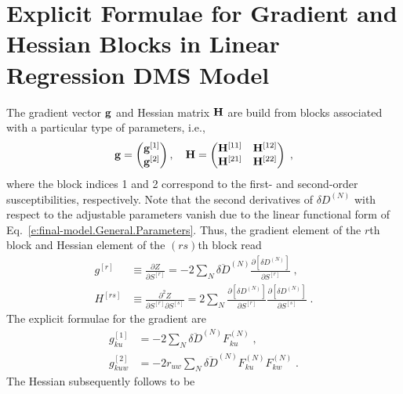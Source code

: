 \documentclass[aip,amsmath,amssymb,reprint,floatfix]{revtex4-1}
\begin{document}
\section{\label{a:blocks} Explicit Formulae for Gradient and Hessian Blocks in Linear Regression DMS Model}

The gradient vector ${\bf g}$ and Hessian matrix ${\bf H}$ 
are build from blocks associated with a particular type of parameters, i.e.,
%
\begin{equation}\label{e:Newton.gH}
 {\bf g} = 
\begin{pmatrix}
{\bf g}^{[1]} \\ 
{\bf g}^{[2]} 
\end{pmatrix} ,\quad
 {\bf H} = 
\begin{pmatrix}
{\bf H}^{[11]} & {\bf H}^{[12]}  \\ 
{\bf H}^{[21]} & {\bf H}^{[22]}  
\end{pmatrix} \;,
\end{equation}
%
where the block indices 1 and 2 correspond to the first\hyp{} and second\hyp{}order susceptibilities, respectively.
Note that the second derivatives of $\delta D^{(N)}$ 
with respect to the adjustable parameters vanish
due to the linear functional form of Eq.~\eqref{e:final-model.General.Parameters}.
Thus, the gradient element of the $r$th block and Hessian element of the $(rs)$th block read
%
\begin{subequations}
 \begin{align}
  g^{[r ]}    &\equiv \frac{\partial   Z}{\partial S^{[r]}} 
     =-2\sum_N \overline{\delta D}^{(N)}
               \frac{\partial   \left[ \delta D^{(N)} \right]}{\partial S^{[r]}} \;,\\
  H^{[rs]} &\equiv \frac{\partial^2 Z}{\partial S^{[r]} \partial S^{[s]}}  
     = 2\sum_N 
        \frac{\partial   \left[ \delta D^{(N)} \right]}{\partial S^{[r]}}
        \frac{\partial   \left[ \delta D^{(N)} \right]}{\partial S^{[s]}} \;.
 \end{align}
\end{subequations}
%
The explicit formulae for the gradient are
%
\begin{subequations}
 \begin{align}
  g^{[1]}_{ku} &=-2\sum_N \overline{\delta D}^{(N)} F^{(N)}_{ku} \;,\\
  g^{[2]}_{kuw} &=-2r_{uw} \sum_N \overline{\delta D}^{(N)} F^{(N)}_{ku} F^{(N)}_{kw} \;.
 \end{align}
\end{subequations}
%
The Hessian subsequently follows to be
\end{document}
